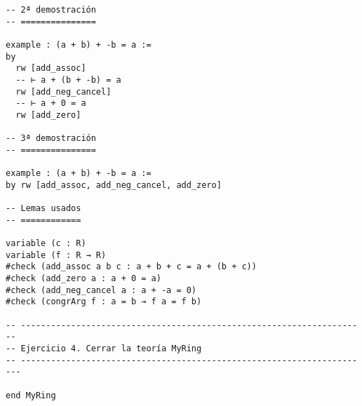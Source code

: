 \begin{verbatim}
-- 2ª demostración
-- ===============

example : (a + b) + -b = a :=
by
  rw [add_assoc]
  -- ⊢ a + (b + -b) = a
  rw [add_neg_cancel]
  -- ⊢ a + 0 = a
  rw [add_zero]

-- 3ª demostración
-- ===============

example : (a + b) + -b = a :=
by rw [add_assoc, add_neg_cancel, add_zero]

-- Lemas usados
-- ============

variable (c : R)
variable (f : R → R)
#check (add_assoc a b c : a + b + c = a + (b + c))
#check (add_zero a : a + 0 = a)
#check (add_neg_cancel a : a + -a = 0)
#check (congrArg f : a = b → f a = f b)

-- ---------------------------------------------------------------------
-- Ejercicio 4. Cerrar la teoría MyRing
-- ----------------------------------------------------------------------

end MyRing
\end{verbatim}

